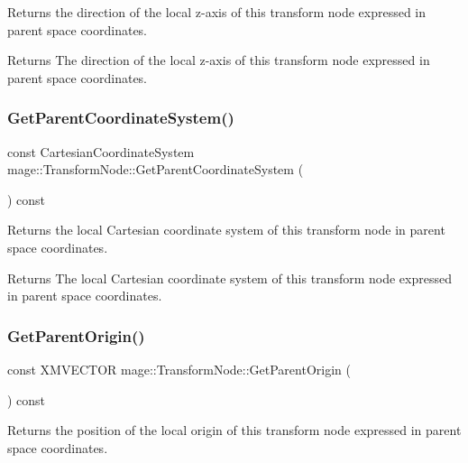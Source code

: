 Returns the direction of the local z-\/axis of this transform node expressed in parent space coordinates.

\begin{DoxyReturn}{Returns}
The direction of the local z-\/axis of this transform node expressed in parent space coordinates. 
\end{DoxyReturn}
\hypertarget{classmage_1_1_transform_node_aff2b422a7d240d4d2278f2960e18b3bf}{}\label{classmage_1_1_transform_node_aff2b422a7d240d4d2278f2960e18b3bf} 
\subsubsection{\texorpdfstring{Get\+Parent\+Coordinate\+System()}{GetParentCoordinateSystem()}}
{\footnotesize\ttfamily const Cartesian\+Coordinate\+System mage\+::\+Transform\+Node\+::\+Get\+Parent\+Coordinate\+System (\begin{DoxyParamCaption}{ }\end{DoxyParamCaption}) const}

Returns the local Cartesian coordinate system of this transform node in parent space coordinates.

\begin{DoxyReturn}{Returns}
The local Cartesian coordinate system of this transform node expressed in parent space coordinates. 
\end{DoxyReturn}
\hypertarget{classmage_1_1_transform_node_ac22e00fc9d96642bf96bcbb121d685ab}{}\label{classmage_1_1_transform_node_ac22e00fc9d96642bf96bcbb121d685ab} 
\subsubsection{\texorpdfstring{Get\+Parent\+Origin()}{GetParentOrigin()}}
{\footnotesize\ttfamily const X\+M\+V\+E\+C\+T\+OR mage\+::\+Transform\+Node\+::\+Get\+Parent\+Origin (\begin{DoxyParamCaption}{ }\end{DoxyParamCaption}) const}

Returns the position of the local origin of this transform node expressed in parent space coordinates.

